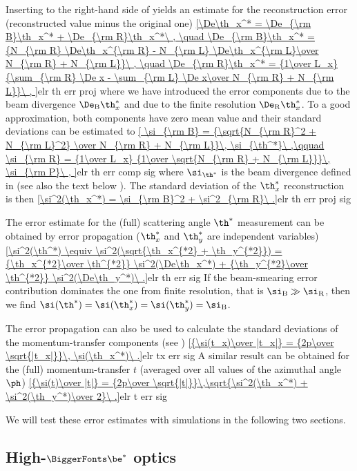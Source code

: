 Inserting  to the right-hand side of  yields an estimate for the reconstruction error (reconstructed value minus the original one)
\eqref{\De\th_x^* = \De_{\rm B}\th_x^* + \De_{\rm R}\th_x^*\ ,
	\quad \De_{\rm B}\th_x^* = {N_{\rm R} \De\th_x^{\rm R} - N_{\rm L} \De\th_x^{\rm L}\over N_{\rm R} + N_{\rm L}}\ ,
	\quad \De_{\rm R}\th_x^* = {1\over L_x} {\sum_{\rm R} \De x - \sum_{\rm L} \De x\over  N_{\rm R} + N_{\rm L}}\ ,
}{elr th err proj}
where we have introduced the error components due to the beam divergence $\De_{\rm B}\th_x^*$ and due to the finite resolution $\De_{\rm R}\th_x^*$. To a good approximation, both components have zero mean value and their standard deviations can be estimated to
\eqref{
	\si_{\rm B} = {\sqrt{N_{\rm R}^2 + N_{\rm L}^2} \over N_{\rm R} + N_{\rm L}}\, \si_{\th^*}\ ,\qquad
	\si_{\rm R} = {1\over L_x} {1\over \sqrt{N_{\rm R} + N_{\rm L}}}\, \si_{\rm P}\ ,
}{elr th err comp sig}
where $\si_{\th^*}$ is the beam divergence defined in  (see also the text below ). The standard deviation of the $\th_x^*$ reconstruction is then
\eqref{\si^2(\th_x^*) = \si_{\rm B}^2 + \si^2_{\rm R}\ .}{elr th err proj sig}

The error estimate for the (full) scattering angle $\th^*$ measurement can be obtained by error propagation ($\th_x^*$ and $\th_y^*$ are independent variables)
\eqref{\si^2(\th^*) \equiv \si^2(\sqrt{\th_x^{*2} + \th_y^{*2}}) = {\th_x^{*2}\over \th^{*2}} \si^2(\De\th_x^*) + {\th_y^{*2}\over \th^{*2}} \si^2(\De\th_y^*)\ .}{elr th err sig}
If the beam-smearing error contribution dominates the one from finite resolution, that is $\si_{\rm B} \gg \si_{\rm R}$, then we find $\si(\th^*) = \si(\th_x^*) = \si(\th_y^*) = \si_{\rm B}$.

The error propagation can also be used to calculate the standard deviations of the momentum-transfer components (see )
\eqref{{\si(t_x)\over |t_x|} = {2p\over \sqrt{|t_x|}}\, \si(\th_x^*)\ .}{elr tx err sig}
A similar result can be obtained for the (full) momentum-transfer $t$ (averaged over all values of the azimuthal angle $\ph$)
\eqref{{\si(t)\over |t|} = {2p\over \sqrt{|t|}}\,\sqrt{\si^2(\th_x^*) + \si^2(\th_y^*)\over 2}\ .}{elr t err sig}

We will test these error estimates with  simulations in the following two sections.


\def\OutlineLabel{High-beta* optics}
\def\TOCLabel{High-$\be^*$ optics}
\subsection[elr 1535]{High-$\BiggerFonts\mathbf{\be^*}$ optics}

